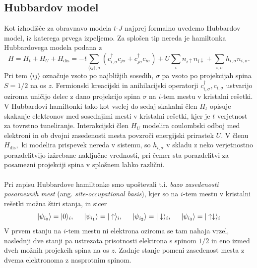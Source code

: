 \subsection{Hubbardov model}
Kot izhodišče za obravnavo modela $t$-$J$ najprej formalno uvedemo Hubbardov model, iz katerega prvega izpeljemo. Za splošen tip nereda je hamiltonka Hubbardovega modela podana z 
\begin{equation}\label{eq:hubbard_main_text}
H=H_t + H_U+ H_\mathrm{dis}=-t\sum\limits_{\langle ij \rangle, \sigma}\left(c^\dagger_{i,\sigma} c_{j\sigma} + c^\dagger_{j\sigma}c_{i\sigma}\right) + U\sum_i n_{i\uparrow}n_{i\downarrow} +  \sum\limits_{i,\sigma} h_{i,\sigma} n_{i, \sigma}. 
\end{equation}
Pri tem  $\langle ij \rangle$ označuje vsoto po najbližjih sosedih, $\sigma$ pa vsoto po projekcijah spina $S=1/2$ na os $z$. Fermionski kreacijski in anihilacijski operatorji $c^\dagger_{i,\sigma}, c_{i,\sigma}$ ustvarijo oziroma uničijo delec z dano projekcijo spina $\sigma$ na $i$-tem mestu v kristalni rešetki.  V Hubbardovi hamiltonki tako kot vselej do sedaj skakalni člen $H_t$ opisuje skakanje elektronov med sosednjimi mesti v kristalni rešetki, kjer je $t$ verjetnost za tovrstno tuneliranje. Interakcijski člen $H_U$ modelira coulombski odboj med elektroni in ob dvojni zasedenosti mesta povzroči energijski prirastek $U.$ V členu $H_\mathrm{dis},$ ki modelira prispevek nereda v sistemu, so  $h_{i,\sigma}$ v skladu z neko verjetnostno porazdelitvijo izžrebane naključne vrednosti, pri čemer sta porazdelitvi za posamezni projekciji spina v splošnem lahko različni. \\\\
Pri zapisu Hubbardove hamiltonke smo upoštevali t.i. \emph{bazo zasedenosti posameznih mest} (ang. \emph{site-occupational basis}), kjer so na $i$-tem mestu v kristalni rešetki možna štiri stanja, in sicer 
\begin{equation}\label{eq:hubstates}
\vert\psi_{i_0}\rangle=\vert0\rangle_i, \hspace{5mm} \vert\psi_{i_1}\rangle=\vert\uparrow\rangle_i,\hspace{5mm} \vert\psi_{i_{2}}\rangle=\vert\downarrow\rangle_i, \hspace{5mm} \vert\psi_{i_{3}}\rangle=\vert\uparrow\downarrow\rangle_i
\end{equation}
V prvem stanju na $i$-tem mestu ni elektrona oziroma se tam nahaja vrzel, naslednji dve stanji pa ustrezata prisotnosti elektrona s spinom $1/2$ in eno izmed dveh možnih projekcih spina na os $z$. Zadnje stanje pomeni zasedenost mesta z dvema elektronoma z nasprotnim spinom. \\\\
